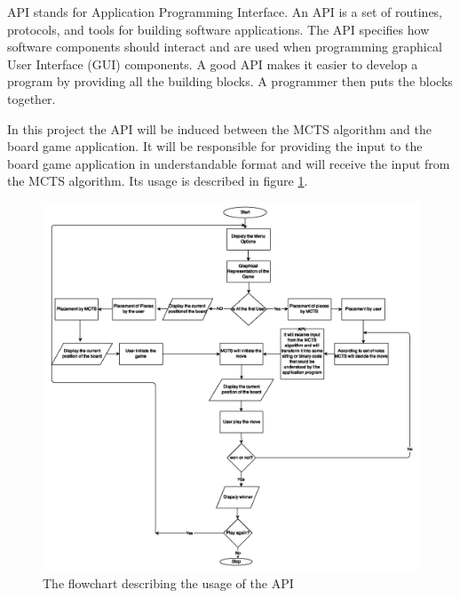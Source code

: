 API stands for Application Programming Interface. An API is a set of routines, protocols, and tools for building software applications. The API specifies how software components should interact and are used when programming graphical User Interface (GUI) components. A good API makes it easier to develop a program by providing all the building blocks. A programmer then puts the blocks together.

 In this project the API will be induced between the MCTS algorithm and the board game application. It will be responsible for providing the input to the board game application in understandable format and will receive the input from the MCTS algorithm. Its usage is described in figure \ref{fig:flowchart}.

\bigbreak

\begin{figure}[!h]
\centering
\includegraphics[width=\textwidth]{2General_Architecture/2.2API/flow.png}
\caption{The flowchart describing the usage of the API}
\label{fig:flowchart}
\end{figure}


